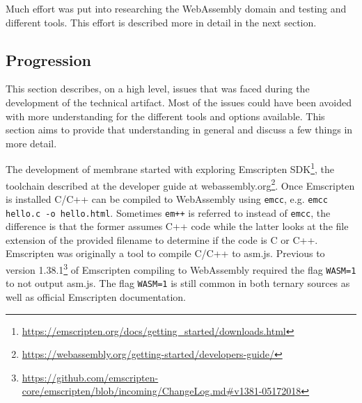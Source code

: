 
Much effort was put into researching the WebAssembly domain and testing and different tools. This effort is described more in detail in the next section.


\subsection{Progression}

This section describes, on a high level, issues that was faced during the development of the technical artifact. Most of the issues could have been avoided with more understanding for the different tools and options available. This section aims to provide that understanding in general and discuss a few things in more detail.

The development of membrane started with exploring Emscripten SDK\footnote{\url{https://emscripten.org/docs/getting_started/downloads.html}}, the toolchain described at the developer guide at webassembly.org\footnote{\url{https://webassembly.org/getting-started/developers-guide/}}. Once Emscripten is installed C/C++ can be compiled to WebAssembly using \texttt{emcc}, e.g. \texttt{emcc hello.c -o hello.html}. Sometimes \texttt{em++} is referred to instead of \texttt{emcc}, the difference is that the former assumes C++ code while the latter looks at the file extension of the provided filename to determine if the code is C or C++. Emscripten was originally a tool to compile C/C++ to asm.js. Previous to version 1.38.1\footnote{\url{https://github.com/emscripten-core/emscripten/blob/incoming/ChangeLog.md\#v1381-05172018}} of Emscripten compiling to WebAssembly required the flag \texttt{WASM=1} to not output asm.js. The flag \texttt{WASM=1} is still common in both ternary sources as well as official Emscripten documentation.

